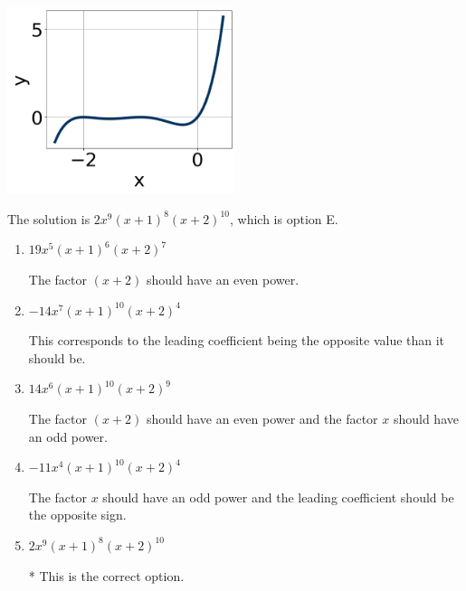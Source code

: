 \documentclass{extbook}[14pt]
\begin{document}
\begin{enumerate}
{\begin{center}
    \includegraphics[width=0.5\textwidth]{../Figures/polyGraphToFunctionCopyC.png}
\end{center}


The solution is \( 2x^{9} (x + 1)^{8} (x + 2)^{10} \), which is option E.\begin{enumerate}[label=\Alph*.]
\item \( 19x^{5} (x + 1)^{6} (x + 2)^{7} \)

The factor $(x + 2)$ should have an even power.
\item \( -14x^{7} (x + 1)^{10} (x + 2)^{4} \)

This corresponds to the leading coefficient being the opposite value than it should be.
\item \( 14x^{6} (x + 1)^{10} (x + 2)^{9} \)

The factor $(x + 2)$ should have an even power and the factor $x$ should have an odd power.
\item \( -11x^{4} (x + 1)^{10} (x + 2)^{4} \)

The factor $x$ should have an odd power and the leading coefficient should be the opposite sign.
\item \( 2x^{9} (x + 1)^{8} (x + 2)^{10} \)

* This is the correct option.
\end{enumerate}

}
\end{enumerate}
\end{document}
